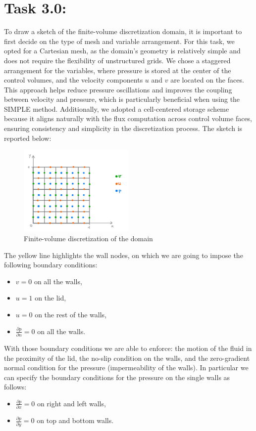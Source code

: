 \documentclass{article}
\begin{document}
\section*{\Large Task 3.0:}
To draw a sketch of the finite-volume discretization domain, it is important to first decide on the type of mesh and variable arrangement. For this task, we opted for a Cartesian mesh, as the domain's geometry is relatively simple and does not require the flexibility of unstructured grids. We chose a staggered arrangement for the variables, where pressure is stored at the center of the control volumes, and the velocity components $u$ and $v$ are located on the faces. This approach helps reduce pressure oscillations and improves the coupling between velocity and pressure, which is particularly beneficial when using the SIMPLE method. Additionally, we adopted a cell-centered storage scheme because it aligns naturally with the flux computation across control volume faces, ensuring consistency and simplicity in the discretization process.
The sketch is reported below:
\begin{figure}[h!]
  \centering
  \includegraphics[width=0.5\textwidth]{staggered_grid.jpg}
  \caption{Finite-volume discretization of the domain}
\end{figure}
The yellow line highlights the wall nodes, on which we are going to impose the following boundary conditions:
\begin{itemize}
    \item $v = 0$ on all the walls,
    \item $u = 1$ on the lid,
    \item $u = 0$ on the rest of the walls,
    \item $\frac{\partial p}{\partial n} = 0$ on all the walls.
\end{itemize}
With those boundary conditions we are able to enforce: the motion of the fluid in the proximity of the lid, the no-slip condition on the walls, and the zero-gradient normal condition for the pressure (impermeability of the walls).
In particular we can specify the boundary conditions for the pressure on the single walls as follows:
\begin{itemize}
    \item $\frac{\partial p}{\partial x} = 0$ on right and left walls,
    \item $\frac{\partial p}{\partial y} = 0$ on top and bottom walls.
\end{itemize}
\end{document}
